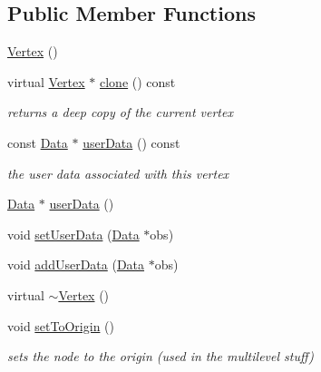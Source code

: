 \subsection*{Public Member Functions}
\begin{DoxyCompactItemize}
\item 
\mbox{\hyperlink{classg2o_1_1_optimizable_graph_1_1_vertex_a1f5fd4210abfa0f8b8e7dd279f561986}{Vertex}} ()
\item 
virtual \mbox{\hyperlink{classg2o_1_1_optimizable_graph_1_1_vertex}{Vertex}} $\ast$ \mbox{\hyperlink{classg2o_1_1_optimizable_graph_1_1_vertex_a32e33f86c169e234a0dde54d1309e5e3}{clone}} () const
\begin{DoxyCompactList}\small\item\em returns a deep copy of the current vertex \end{DoxyCompactList}\item 
const \mbox{\hyperlink{classg2o_1_1_optimizable_graph_1_1_data}{Data}} $\ast$ \mbox{\hyperlink{classg2o_1_1_optimizable_graph_1_1_vertex_a506c9664e88d886ba612d3ea95b6c76b}{user\+Data}} () const
\begin{DoxyCompactList}\small\item\em the user data associated with this vertex \end{DoxyCompactList}\item 
\mbox{\hyperlink{classg2o_1_1_optimizable_graph_1_1_data}{Data}} $\ast$ \mbox{\hyperlink{classg2o_1_1_optimizable_graph_1_1_vertex_a768057be134ffe93bc88b020d031eee5}{user\+Data}} ()
\item 
void \mbox{\hyperlink{classg2o_1_1_optimizable_graph_1_1_vertex_a858d15a4fadebfc8bce0162ac675f608}{set\+User\+Data}} (\mbox{\hyperlink{classg2o_1_1_optimizable_graph_1_1_data}{Data}} $\ast$obs)
\item 
void \mbox{\hyperlink{classg2o_1_1_optimizable_graph_1_1_vertex_a8f7ac810cad82a004365c1221fd16234}{add\+User\+Data}} (\mbox{\hyperlink{classg2o_1_1_optimizable_graph_1_1_data}{Data}} $\ast$obs)
\item 
virtual \mbox{\hyperlink{classg2o_1_1_optimizable_graph_1_1_vertex_ac2208bfef95bba9670f13933d68fb929}{$\sim$\+Vertex}} ()
\item 
void \mbox{\hyperlink{classg2o_1_1_optimizable_graph_1_1_vertex_ab10678592b5e707bf4abdc0ff6b8e4bf}{set\+To\+Origin}} ()
\begin{DoxyCompactList}\small\item\em sets the node to the origin (used in the multilevel stuff) \end{DoxyCompactList}\item 

\end{DoxyCompactItemize}
